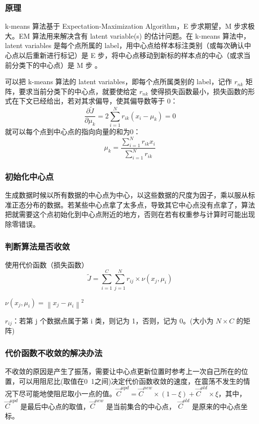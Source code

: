 \documentclass[UTF8]{ctexart}
\begin{document}
        \subsubsection{原理}
            k-means 算法基于 Expectation-Maximization Algorithm，E 步求期望，M 步求极大。EM 算法用来解决含有 latent variable(s) 的估计问题。在 k-means 算法中，latent variables 是每个点所属的 label，用中心点给样本标注类别（或每次确认中心点以后重新进行标记）是 E 步，将中心点移动到新标的样本点的中心（或求当前分类下的中心点）是 M 步 \cite{link5}。

            可以把 k-means 算法的 latent variables，即每个点所属类别的 label，记作 \( r_{nk} \) 矩阵，要求当前分类下的中心点，就要使给定 \( r_{nk} \) 使得损失函数最小，损失函数的形式在下文已经给出，若对其求偏导，使其偏导数等于 0：$$
            \frac{\partial \widetilde{J}}{\partial \mu_{k}}=2 \sum_{i=1}^{N} r_{i k}\left(x_{i}-\mu_{k}\right)=0$$ 就可以每个点到中心点的指向向量的和为0：$$
            \mu_{k}=\frac{\sum_{i=1}^{N} r_{i k} x_{i}}{\sum_{i=1}^{N} r_{i k}}$$

        \subsubsection{初始化中心点}
            生成数据时候以所有数据的中心点为中心，以这些数据的尺度为因子，乘以服从标准正态分布的数据。若某些中心点拿了太多点，导致其它中心点没有点拿了，算法把就需要这个点初始化到中心点附近的地方，否则在若有权重参与计算时可能出现除零错误。

        \subsubsection{判断算法是否收敛}
            使用代价函数（损失函数） $$\widetilde{J}=\sum_{i=1}^{C} \sum_{j=1}^{N} r_{i j} \times \nu\left(x_{j}, \mu_{i}\right)$$
            
            \( \nu\left(x_{j}, \mu_{i}\right)=\left\|x_{j}-\mu_{i}\right\|^{2} \) 
            
            \( r_{i j} \)：若第 j 个数据点属于第 i 类，则记为 1，否则，记为 0。(大小为 \( {N} \times {C} \) 的矩阵)

        \subsubsection{代价函数不收敛的解决办法}
            不收敛的原因是产生了振荡，需要让中心点更新位置时参考上一次自己所在的位置，可以用阻尼比(取值在0~1之间)决定代价函数收敛的速度，在震荡不发生的情况下尽可能地使阻尼取小一点的值。\( \vec{C}^{u p d}=\vec{C}^{n e w} \times(1-\xi)+\vec{C}^{o l d} \times \xi \)，其中，\( \vec{C}^{u p d} \) 是最后中心点的取值，\( \vec{C}^{n e w}\) 是当前集合的中心点， \( \vec{C}^{o l d} \) 是原来的中心点坐标。\cite{link4}
\end{document}
